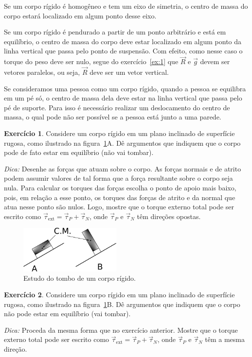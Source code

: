 \documentclass[twocolumn=on,fontsize=12pt,DIV=calc]{scrartcl}
\theoremstyle{definition}
\newtheorem{ex}{Exercício}[section]
\begin{document}
Se um corpo rígido é homogêneo e tem um eixo de simetria, o centro de
massa do corpo estará localizado em algum ponto desse eixo.

Se um corpo rígido é pendurado a partir de um ponto arbitrário e está
em equilíbrio, o centro de massa do corpo deve estar localizado em
algum ponto da linha vertical que passa pelo ponto de suspensão. Com
efeito, como nesse caso o torque do peso deve ser nulo, segue do
exercício~\ref{ex:1} que $\vec R$ e $\vec g$ devem ser vetores
paralelos, ou seja, $\vec R$ deve ser um vetor vertical.

Se consideramos uma pessoa como um corpo rígido, quando a pessoa se
equilibra em um pé só, o centro de massa dela deve estar na linha
vertical que passa pelo pé de suporte. Para isso é necessário realizar
um deslocamento do centro de massa, o qual pode não ser possível se a
pessoa está junto a uma parede.

\begin{ex}
  Considere um corpo rígido em um plano inclinado de superfície
  rugosa, como ilustrado na figura~\ref{fig:tombo}A. Dê argumentos que
  indiquem que o corpo pode de fato estar em equilíbrio (não vai
  tombar).

  \noindent\textit{Dica:} Desenhe as forças que atuam sobre o
  corpo. As forças normais e de atrito podem assumir valores de tal
  forma que a força resultante sobre o corpo seja nula. Para calcular
  os torques das forças escolha o ponto de apoio mais baixo, pois, em
  relação a esse ponto, os torques das forças de atrito e da normal
  que atua nesse ponto são nulos. Logo, mostre que o torque externo
  total pode ser escrito como
  $\vec \tau_{\mathrm{ext}}=\vec\tau_P+\vec\tau_N$, onde $\vec\tau_P$
  e $\vec\tau_N$ têm direções opostas.
  \begin{figure}[ht]
    \centering
    \includegraphics[width=0.45\textwidth,keepaspectratio]{aux/tombo.pdf}
    \caption{Estudo do tombo de um corpo rígido.}
    \label{fig:tombo}
  \end{figure}
\end{ex}

\begin{ex}
  Considere um corpo rígido em um plano inclinado de superfície
  rugosa, como ilustrado na figura~\ref{fig:tombo}B. Dê argumentos que
  indiquem que o corpo não pode estar em equilíbrio (vai tombar).

  \noindent\textit{Dica:} Proceda da mesma forma que no exercício
  anterior. Mostre que o torque externo total pode ser escrito como
  $\vec\tau_{\mathrm{ext}}=\vec\tau_P+\vec\tau_N$, onde $\vec\tau_P$ e
  $\vec\tau_N$ têm a mesma direção.
\end{ex}
\end{document}
